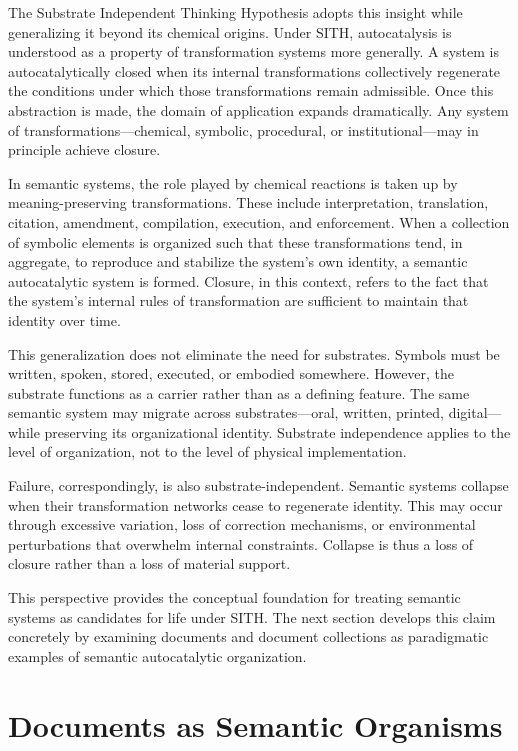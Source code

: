 \documentclass[11pt,oneside]{article}
\begin{document}
The Substrate Independent Thinking Hypothesis adopts this insight while generalizing it beyond its chemical origins. Under SITH, autocatalysis is understood as a property of transformation systems more generally. A system is autocatalytically closed when its internal transformations collectively regenerate the conditions under which those transformations remain admissible. Once this abstraction is made, the domain of application expands dramatically. Any system of transformations—chemical, symbolic, procedural, or institutional—may in principle achieve closure.

In semantic systems, the role played by chemical reactions is taken up by meaning-preserving transformations. These include interpretation, translation, citation, amendment, compilation, execution, and enforcement. When a collection of symbolic elements is organized such that these transformations tend, in aggregate, to reproduce and stabilize the system’s own identity, a semantic autocatalytic system is formed. Closure, in this context, refers to the fact that the system’s internal rules of transformation are sufficient to maintain that identity over time.

This generalization does not eliminate the need for substrates. Symbols must be written, spoken, stored, executed, or embodied somewhere. However, the substrate functions as a carrier rather than as a defining feature. The same semantic system may migrate across substrates—oral, written, printed, digital—while preserving its organizational identity. Substrate independence applies to the level of organization, not to the level of physical implementation.

Failure, correspondingly, is also substrate-independent. Semantic systems collapse when their transformation networks cease to regenerate identity. This may occur through excessive variation, loss of correction mechanisms, or environmental perturbations that overwhelm internal constraints. Collapse is thus a loss of closure rather than a loss of material support.

This perspective provides the conceptual foundation for treating semantic systems as candidates for life under SITH. The next section develops this claim concretely by examining documents and document collections as paradigmatic examples of semantic autocatalytic organization.

\section{Documents as Semantic Organisms}
\end{document}
